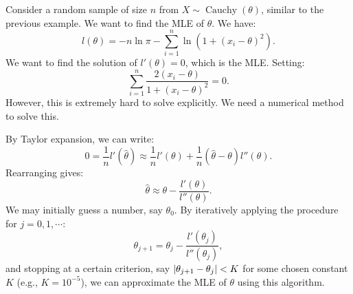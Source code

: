 \documentclass{huhtakm-template-book-v2}
\DeclareMathOperator{\Cauchy}{Cauchy}
\begin{document}
    \begin{eg}
        Consider a random sample of size $n$ from $X \sim \Cauchy(\theta)$, similar to the previous example. We want to find the MLE of $\theta$. We have:
        \begin{equation*}
            l(\theta) = -n\ln{\pi} - \sum_{i=1}^{n} \ln(1 + (x_{i} - \theta)^{2}).
        \end{equation*}
        We want to find the solution of $l'(\theta) = 0$, which is the MLE. Setting:
        \begin{equation*}
            \sum_{i=1}^{n} \frac{2(x_{i} - \theta)}{1 + (x_{i} - \theta)^{2}} = 0.
        \end{equation*}
        However, this is extremely hard to solve explicitly. We need a numerical method to solve this.
    \end{eg}
    \begin{eg}
        By Taylor expansion, we can write:
        \begin{equation*}
            0 = \frac{1}{n}l'(\hat{\theta}) \approx \frac{1}{n}l'(\theta) + \frac{1}{n}(\hat{\theta} - \theta)l''(\theta).
        \end{equation*}
        Rearranging gives:
        \begin{equation*}
            \hat{\theta} \approx \theta - \frac{l'(\theta)}{l''(\theta)}.
        \end{equation*}
        We may initially guess a number, say $\theta_{0}$. By iteratively applying the procedure for $j = 0, 1, \cdots$:
        \begin{equation*}
            \theta_{j+1} = \theta_{j} - \frac{l'(\theta_{j})}{l''(\theta_{j})},
        \end{equation*}
        and stopping at a certain criterion, say $\left|{\theta_{j+1} - \theta_{j}}\right| < K$ for some chosen constant $K$ (e.g., $K = 10^{-5}$), we can approximate the MLE of $\theta$ using this algorithm.
    \end{eg}
\end{document}
